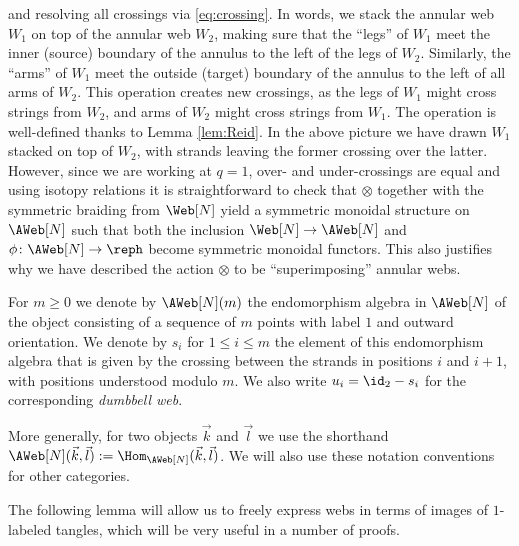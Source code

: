 and resolving all crossings via \eqref{eq:crossing}. In words, we stack the
annular web $W_1$ on top of the annular web $W_2$, making sure that the ``legs'' of $W_1$
meet the inner (source) boundary of the annulus to the left of the legs of
$W_2$. Similarly, the ``arms'' of $W_1$ meet the outside (target) boundary of
the annulus to the left of all arms of $W_2$. This operation creates new
crossings, as the legs of $W_1$ might cross strings from $W_2$, and arms of
$W_2$ might cross strings from $W_1$. The operation is well-defined thanks to
Lemma \ref{lem:Reid}. In the above picture we have drawn $W_1$ stacked on top of
$W_2$, with strands leaving the former crossing over the latter. However, since
we are working at $q=1$, over- and under-crossings are equal and using isotopy
relations it is straightforward to check that $\otimes$ together with the
symmetric braiding from $\Web[N]$ yield a symmetric monoidal structure on
$\AWeb[N]$ such that both the inclusion $\Web[N]\to \AWeb[N]$ and $\phi \colon
\AWeb[N] \to \reph$ become symmetric monoidal functors. This also justifies why
we have described the action $\otimes$ to be ``superimposing'' annular webs. 

\begin{defi} \label{def:si} For $m\geq 0$ we denote by $\AWeb[N](m)$ the
endomorphism algebra in $\AWeb[N]$ of the object consisting of a sequence of $m$
points with label $1$ and outward orientation. We denote by $s_i$ for $1\leq i
\leq m$ the element of this endomorphism algebra that is given by the crossing
between the strands in positions $i$ and $i+1$, with positions understood modulo
$m$. We also write $u_i=\id_2-s_i$ for the corresponding \textit{dumbbell web}.

More generally, for two objects $\vec{k}$ and $\vec{l}$ we use the shorthand $\AWeb[N](\vec{k},\vec{l}):= \Hom_{\AWeb[N]}(\vec{k},\vec{l})$. We will also use these notation conventions for other categories. 
\end{defi}

The following lemma will allow us to freely express webs in terms of images of $1$-labeled tangles, which will be very useful in a number of proofs. 


